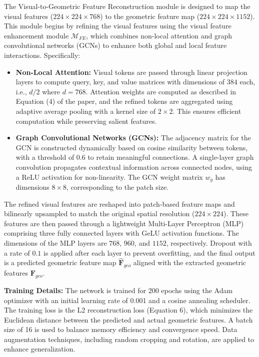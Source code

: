 The Visual-to-Geometric Feature Reconstruction module is designed to map the visual features ($224 \times 224 \times 768$) to the geometric feature map ($224 \times 224 \times 1152$). This module begins by refining the visual features using the visual feature enhancement module $\mathcal{M}_{FE}$, which combines non-local attention and graph convolutional networks (GCNs) to enhance both global and local feature interactions. Specifically:
\begin{itemize}
    \item \textbf{Non-Local Attention:} Visual tokens are passed through linear projection layers to compute query, key, and value matrices with dimensions of $384$ each, i.e., $d/2$ where $d = 768$. Attention weights are computed as described in Equation (4) of the paper, and the refined tokens are aggregated using adaptive average pooling with a kernel size of $2 \times 2$. This ensures efficient computation while preserving salient features.
    \item \textbf{Graph Convolutional Networks (GCNs):} The adjacency matrix for the GCN is constructed dynamically based on cosine similarity between tokens, with a threshold of 0.6 to retain meaningful connections. A single-layer graph convolution propagates contextual information across connected nodes, using a ReLU activation for non-linearity. The GCN weight matrix $w_g$ has dimensions $8 \times 8$, corresponding to the patch size.
\end{itemize}

The refined visual features are reshaped into patch-based feature maps and bilinearly upsampled to match the original spatial resolution ($224 \times 224$). These features are then passed through a lightweight Multi-Layer Perceptron (MLP) comprising three fully connected layers with GeLU activation functions. The dimensions of the MLP layers are $768$, $960$, and $1152$, respectively. Dropout with a rate of $0.1$ is applied after each layer to prevent overfitting, and the final output is a predicted geometric feature map $\hat{\mathbf{F}}_{geo}$ aligned with the extracted geometric features $\mathbf{F}_{geo}$.

\textbf{Training Details:} The network is trained for 200 epochs using the Adam optimizer \cite{kingma2014adam} with an initial learning rate of 0.001 and a cosine annealing scheduler. The training loss is the L2 reconstruction loss (Equation 6), which minimizes the Euclidean distance between the predicted and actual geometric features. A batch size of 16 is used to balance memory efficiency and convergence speed. Data augmentation techniques, including random cropping and rotation, are applied to enhance generalization.


